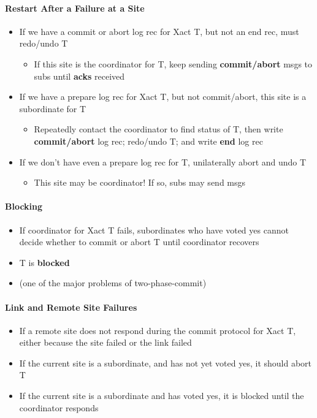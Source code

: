 \paragraph{Restart After a Failure at a Site}
\begin{itemize}
\item If we have a commit or abort log rec for Xact T, but
  not an end rec, must redo/undo T
  \begin{itemize}
  \item If this site is the coordinator for T, keep sending
    \textbf{commit/abort} msgs to subs until \textbf{acks} received
  \end{itemize}

\item If we have a prepare log rec for Xact T, but not
  commit/abort, this site is a subordinate for T
  \begin{itemize}
  \item Repeatedly contact the coordinator to find status of T,
    then write \textbf{commit/abort} log rec; redo/undo T; and
    write \textbf{end} log rec
  \end{itemize}

\item If we don't have even a prepare log rec for T, unilaterally abort
  and undo T
  \begin{itemize}
  \item This site may be coordinator! If so, subs may send msgs
  \end{itemize}
\end{itemize}


\paragraph{Blocking}
\begin{itemize}
\item If coordinator for Xact T fails, subordinates who have
  voted yes cannot decide whether to commit or abort T until
  coordinator recovers
\item T is \textbf{blocked}
\item (one of the major problems of two-phase-commit)
\end{itemize}


\paragraph{Link and Remote Site Failures}
\begin{itemize}
\item If a remote site does not respond during the commit protocol
  for Xact T, either because the site failed or the link failed
\item If the current site is a subordinate, and has not
  yet voted yes, it should abort T
\item If the current site is a subordinate and has voted yes,
  it is blocked until the coordinator responds
\end{itemize}

